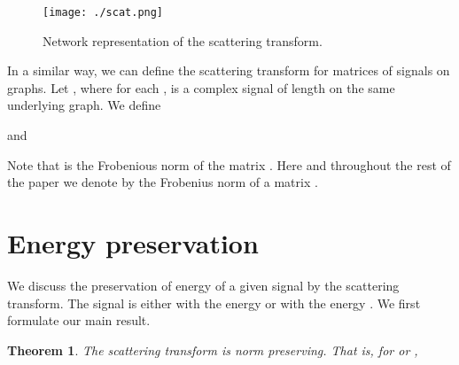 \documentclass{article}
\newtheorem{theorem}{Theorem}[section]
\begin{document}
\begin{figure}[!ht]
\centering
\texttt{[image: ./scat.png]}
\caption{Network representation of the scattering transform.}
\label{fig:cnn}
\end{figure}

In a similar way, we can define the scattering transform for matrices of signals on graphs. Let , where for each ,   is a  complex signal of length  on the same underlying graph. We define

and

Note that  is the Frobenious norm of the matrix . Here and throughout the rest of the paper we denote by  the Frobenius norm of a matrix .

\section{Energy preservation}\label{sec:energy}

We discuss the preservation of energy of a given signal by the scattering transform. The signal is either  with the energy  or  with the energy . We first formulate our main result.

\begin{theorem}\label{thm:normPreserving}
The scattering transform is norm preserving. That is, for  or ,

\end{theorem}
\end{document}
